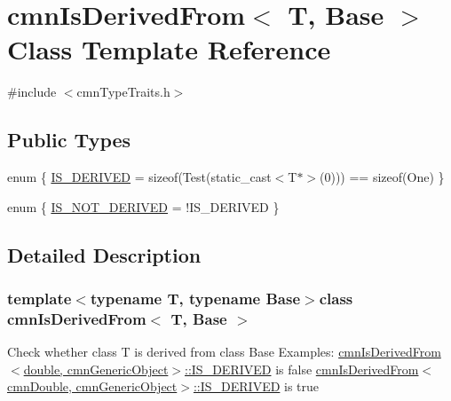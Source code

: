 \hypertarget{classcmn_is_derived_from}{}\section{cmn\+Is\+Derived\+From$<$ T, Base $>$ Class Template Reference}
\label{classcmn_is_derived_from}


{\ttfamily \#include $<$cmn\+Type\+Traits.\+h$>$}

\subsection*{Public Types}
\begin{DoxyCompactItemize}
\item 
enum \{ \hyperlink{classcmn_is_derived_from_a65a36468e89d50a80c11e25cf58c8e75af3a2348d584176f8c4bfae532328995c}{I\+S\+\_\+\+D\+E\+R\+I\+V\+E\+D} = sizeof(Test(static\+\_\+cast$<$T$\ast$$>$(0))) == sizeof(One)
 \}
\item 
enum \{ \hyperlink{classcmn_is_derived_from_a8c4e19bd9b70a51bfc0d6bd0aea19334a533e6436963bc9d801b91be0244d5050}{I\+S\+\_\+\+N\+O\+T\+\_\+\+D\+E\+R\+I\+V\+E\+D} = !\+I\+S\+\_\+\+D\+E\+R\+I\+V\+E\+D
 \}
\end{DoxyCompactItemize}


\subsection{Detailed Description}
\subsubsection*{template$<$typename T, typename Base$>$class cmn\+Is\+Derived\+From$<$ T, Base $>$}

Check whether class T is derived from class Base Examples\+: \hyperlink{classcmn_is_derived_from_a65a36468e89d50a80c11e25cf58c8e75af3a2348d584176f8c4bfae532328995c}{cmn\+Is\+Derived\+From$<$double, cmn\+Generic\+Object$>$\+::\+I\+S\+\_\+\+D\+E\+R\+I\+V\+E\+D} is false \hyperlink{classcmn_is_derived_from_a65a36468e89d50a80c11e25cf58c8e75af3a2348d584176f8c4bfae532328995c}{cmn\+Is\+Derived\+From$<$cmn\+Double, cmn\+Generic\+Object$>$\+::\+I\+S\+\_\+\+D\+E\+R\+I\+V\+E\+D} is true 

